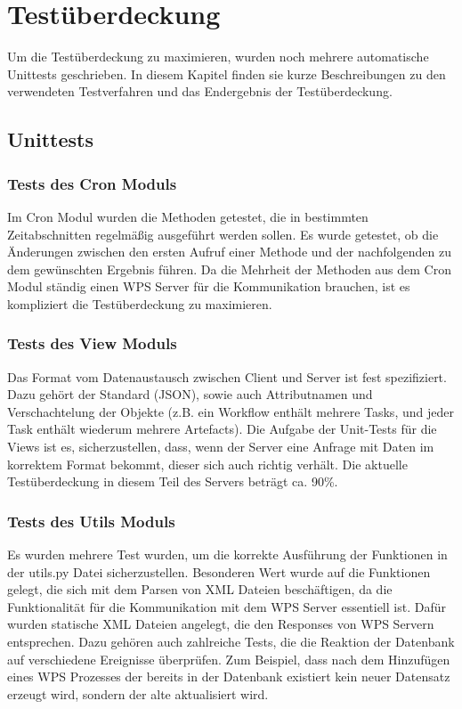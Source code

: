\chapter{Testüberdeckung}

Um die Testüberdeckung zu maximieren, wurden noch mehrere automatische Unittests geschrieben. In diesem Kapitel finden sie kurze Beschreibungen zu den verwendeten Testverfahren und das Endergebnis der Testüberdeckung.
\section{Unittests}
\subsection{Tests des Cron Moduls}
Im Cron Modul wurden die Methoden getestet, die in bestimmten Zeitabschnitten regelmäßig ausgeführt werden sollen. Es wurde getestet, ob die Änderungen zwischen den ersten Aufruf einer Methode und der nachfolgenden zu dem gewünschten Ergebnis führen. Da die Mehrheit der Methoden aus dem Cron Modul ständig einen WPS Server für die Kommunikation brauchen, ist es kompliziert die Testüberdeckung zu maximieren.
\subsection{Tests des View Moduls}

Das Format vom Datenaustausch zwischen Client und Server ist fest spezifiziert. Dazu gehört der Standard (\gls{JSON}), sowie auch Attributnamen und Verschachtelung der Objekte (z.B. ein Workflow enthält mehrere Tasks, und jeder Task enthält wiederum mehrere Artefacts). Die Aufgabe der Unit-Tests für die Views ist es, sicherzustellen, dass, wenn der Server eine Anfrage mit Daten im korrektem Format bekommt, dieser sich auch richtig verhält. Die aktuelle Testüberdeckung in diesem Teil des Servers beträgt ca. 90\%.

\subsection{Tests des Utils Moduls}
Es wurden mehrere Test wurden, um die korrekte Ausführung der Funktionen in der utils.py Datei sicherzustellen. Besonderen Wert wurde auf die Funktionen gelegt, die sich mit dem \gls{Parsen} von XML Dateien beschäftigen, da die Funktionalität für die Kommunikation mit dem WPS Server essentiell ist. Dafür wurden statische XML Dateien angelegt, die den Responses von WPS Servern entsprechen. \newline
Dazu gehören auch zahlreiche Tests, die die Reaktion der Datenbank auf verschiedene Ereignisse überprüfen. Zum Beispiel, dass nach dem Hinzufügen eines WPS Prozesses der bereits in der Datenbank existiert kein neuer Datensatz erzeugt wird, sondern der alte aktualisiert wird.


